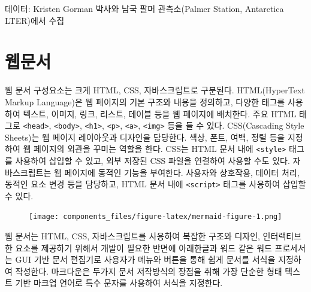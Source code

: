 \documentclass[
  letterpaper,
]{book}
\begin{document}
\begin{minipage}{\linewidth}
데이터: Kristen Gorman 박사와 남국 팔머 관측소(Palmer Station, Antarctica LTER)에서 수집\\
\end{minipage}

\hypertarget{uxc6f9uxbb38uxc11c}{%
\section{웹문서}\label{uxc6f9uxbb38uxc11c}}

웹 문서 구성요소는 크게 HTML, CSS, 자바스크립트로 구분된다.
HTML(HyperText Markup Language)은 웹 페이지의 기본 구조와 내용을
정의하고, 다양한 태그를 사용하여 텍스트, 이미지, 링크, 리스트, 테이블
등을 웹 페이지에 배치한다. 주요 HTML 태그로
\texttt{\textless{}head\textgreater{}},
\texttt{\textless{}body\textgreater{}},
\texttt{\textless{}h1\textgreater{}},
\texttt{\textless{}p\textgreater{}},
\texttt{\textless{}a\textgreater{}},
\texttt{\textless{}img\textgreater{}} 등을 들 수 있다. CSS(Cascading
Style Sheets)는 웹 페이지 레이아웃과 디자인을 담당한다. 색상, 폰트,
여백, 정렬 등을 지정하여 웹 페이지의 외관을 꾸미는 역할을 한다. CSS는
HTML 문서 내에 \texttt{\textless{}style\textgreater{}} 태그를 사용하여
삽입할 수 있고, 외부 저장된 CSS 파일을 연결하여 사용할 수도 있다.
자바스크립트는 웹 페이지에 동적인 기능을 부여한다. 사용자와 상호작용,
데이터 처리, 동적인 요소 변경 등을 담당하고, HTML 문서 내에
\texttt{\textless{}script\textgreater{}} 태그를 사용하여 삽입할 수 있다.

\begin{figure}[H]

{\centering \texttt{[image: components\_files/figure-latex/mermaid-figure-1.png]}

}

\end{figure}

웹 문서는 HTML, CSS, 자바스크립트를 사용하여 복잡한 구조와 디자인,
인터랙티브한 요소를 제공하기 위해서 개발이 필요한 반면에 아래한글과 워드
같은 워드 프로세서는 GUI 기반 문서 편집기로 사용자가 메뉴와 버튼을 통해
쉽게 문서를 서식을 지정하여 작성한다. 마크다운은 두가지 문서 저작방식의
장점을 취해 가장 단순한 형태 텍스트 기반 마크업 언어로 특수 문자를
사용하여 서식을 지정한다.
\end{document}
